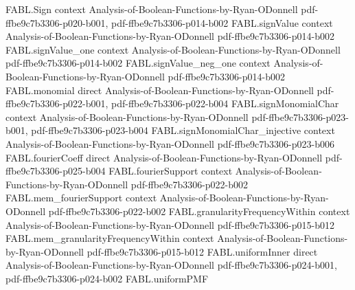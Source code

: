\begin{theorem}
\label{FABL.FiniteFourierBasis.productNoiseOperator_orthogonalComponent}
\leanok
{}
\proofstep
  {FABL.Sign}
  {context}
  {Analysis-of-Boolean-Functions-by-Ryan-ODonnell}
  {pdf-ffbe9c7b3306-p020-b001,
    pdf-ffbe9c7b3306-p014-b002}
\proofstep
  {FABL.signValue}
  {context}
  {Analysis-of-Boolean-Functions-by-Ryan-ODonnell}
  {pdf-ffbe9c7b3306-p014-b002}
\proofstep
  {FABL.signValue_one}
  {context}
  {Analysis-of-Boolean-Functions-by-Ryan-ODonnell}
  {pdf-ffbe9c7b3306-p014-b002}
\proofstep
  {FABL.signValue_neg_one}
  {context}
  {Analysis-of-Boolean-Functions-by-Ryan-ODonnell}
  {pdf-ffbe9c7b3306-p014-b002}
\proofstep
  {FABL.monomial}
  {direct}
  {Analysis-of-Boolean-Functions-by-Ryan-ODonnell}
  {pdf-ffbe9c7b3306-p022-b001,
    pdf-ffbe9c7b3306-p022-b004}
\proofstep
  {FABL.signMonomialChar}
  {context}
  {Analysis-of-Boolean-Functions-by-Ryan-ODonnell}
  {pdf-ffbe9c7b3306-p023-b001,
    pdf-ffbe9c7b3306-p023-b004}
\proofstep
  {FABL.signMonomialChar_injective}
  {context}
  {Analysis-of-Boolean-Functions-by-Ryan-ODonnell}
  {pdf-ffbe9c7b3306-p023-b006}
\proofstep
  {FABL.fourierCoeff}
  {direct}
  {Analysis-of-Boolean-Functions-by-Ryan-ODonnell}
  {pdf-ffbe9c7b3306-p025-b004}
\proofstep
  {FABL.fourierSupport}
  {context}
  {Analysis-of-Boolean-Functions-by-Ryan-ODonnell}
  {pdf-ffbe9c7b3306-p022-b002}
\proofstep
  {FABL.mem_fourierSupport}
  {context}
  {Analysis-of-Boolean-Functions-by-Ryan-ODonnell}
  {pdf-ffbe9c7b3306-p022-b002}
\proofstep
  {FABL.granularityFrequencyWithin}
  {context}
  {Analysis-of-Boolean-Functions-by-Ryan-ODonnell}
  {pdf-ffbe9c7b3306-p015-b012}
\proofstep
  {FABL.mem_granularityFrequencyWithin}
  {context}
  {Analysis-of-Boolean-Functions-by-Ryan-ODonnell}
  {pdf-ffbe9c7b3306-p015-b012}
\proofstep
  {FABL.uniformInner}
  {direct}
  {Analysis-of-Boolean-Functions-by-Ryan-ODonnell}
  {pdf-ffbe9c7b3306-p024-b001,
    pdf-ffbe9c7b3306-p024-b002}
\proofstep
  {FABL.uniformPMF}

\end{theorem}
